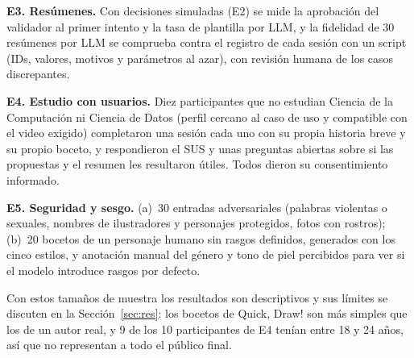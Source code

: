\documentclass[10pt,a4paper,twocolumn]{article}
\begin{document}
\textbf{E3. Resúmenes.} Con decisiones simuladas (E2) se mide la aprobación del validador al primer intento y la tasa de plantilla por LLM, y la fidelidad de 30 resúmenes por LLM se comprueba contra el registro de cada sesión con un script (IDs, valores, motivos y parámetros al azar), con revisión humana de los casos discrepantes.

\textbf{E4. Estudio con usuarios.} Diez participantes que no estudian Ciencia de la Computación ni Ciencia de Datos (perfil cercano al caso de uso y compatible con el video exigido) completaron una sesión cada uno con su propia historia breve y su propio boceto, y respondieron el SUS y unas preguntas abiertas sobre si las propuestas y el resumen les resultaron útiles. Todos dieron su consentimiento informado.

\textbf{E5. Seguridad y sesgo.} (a)~30 entradas adversariales (palabras violentas o sexuales, nombres de ilustradores y personajes protegidos, fotos con rostros); (b)~20 bocetos de un personaje humano sin rasgos definidos, generados con los cinco estilos, y anotación manual del género y tono de piel percibidos para ver si el modelo introduce rasgos por defecto.

Con estos tamaños de muestra los resultados son descriptivos y sus límites se discuten en la Sección~\ref{sec:res}: los bocetos de Quick, Draw! son más simples que los de un autor real, y 9 de los 10 participantes de E4 tenían entre 18 y 24 años, así que no representan a todo el público final.

\end{document}
